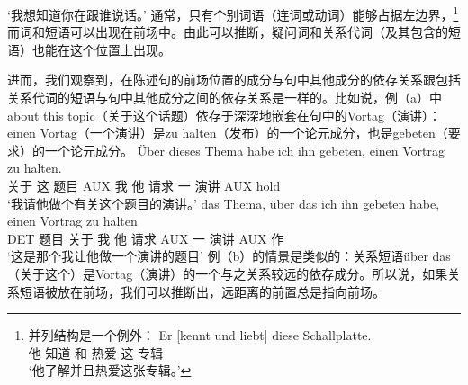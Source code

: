 \glt `我想知道你在跟谁说话。'
\zl
通常，只有个别词语（连词或动词）能够占据左边界，\footnote{
 并列结构是一个例外：
\ea
\gll Er [kennt und liebt] diese Schallplatte.\\
     他 \spacebr{}知道 和 热爱 这 专辑\\
\glt `他了解并且热爱这张专辑。'
\z
} 
而词和短语可以出现在前场中。由此可以推断，疑问词和关系代词（及其包含的短语）也能在这个位置上出现。

进而，我们观察到，在陈述句的前场位置的成分与句中其他成分的依存关系跟包括关系代词的短语与句中其他成分之间的依存关系是一样的。比如说，例（a）中about this topic（关于这个话题）依存于深深地嵌套在句中的Vortag（演讲）：einen Vortag（一个演讲）是zu halten（发布）的一个论元成分，也是gebeten（要求）的一个论元成分。
\eal
\ex 
\gll Über dieses Thema habe ich ihn gebeten, einen Vortrag zu halten.\\
      关于 这 题目  AUX 我   他 请求    一     演讲    AUX hold\\
\glt `我请他做个有关这个题目的演讲。'
\ex 
\gll das Thema, über das ich ihn gebeten habe, einen Vortrag zu halten\\
     DET 题目  关于  我 他 请求  AUX 一 演讲 AUX 作\\
\glt `这是那个我让他做一个演讲的题目'
\zl
例（b）的情景是类似的：关系短语über das（关于这个）是Vortag（演讲）的一个与之关系较远的依存成分。所以说，如果关系短语被放在前场，我们可以推断出，远距离的前置总是指向前场。

